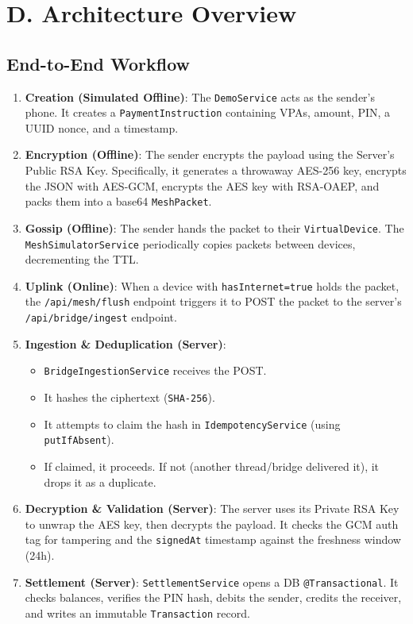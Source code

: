 \documentclass[11pt, a4paper]{article}
\begin{document}
\section*{D. Architecture Overview}

\subsection*{End-to-End Workflow}
\begin{enumerate}
    \item \textbf{Creation (Simulated Offline)}: The \texttt{DemoService} acts as the sender's phone. It creates a \texttt{PaymentInstruction} containing VPAs, amount, PIN, a UUID nonce, and a timestamp.
    \item \textbf{Encryption (Offline)}: The sender encrypts the payload using the Server's Public RSA Key. Specifically, it generates a throwaway AES-256 key, encrypts the JSON with AES-GCM, encrypts the AES key with RSA-OAEP, and packs them into a base64 \texttt{MeshPacket}.
    \item \textbf{Gossip (Offline)}: The sender hands the packet to their \texttt{VirtualDevice}. The \texttt{MeshSimulatorService} periodically copies packets between devices, decrementing the TTL.
    \item \textbf{Uplink (Online)}: When a device with \texttt{hasInternet=true} holds the packet, the \texttt{/api/mesh/flush} endpoint triggers it to POST the packet to the server's \texttt{/api/bridge/ingest} endpoint.
    \item \textbf{Ingestion \& Deduplication (Server)}:
    \begin{itemize}
        \item \texttt{BridgeIngestionService} receives the POST.
        \item It hashes the ciphertext (\texttt{SHA-256}).
        \item It attempts to claim the hash in \texttt{IdempotencyService} (using \texttt{putIfAbsent}).
        \item If claimed, it proceeds. If not (another thread/bridge delivered it), it drops it as a duplicate.
    \end{itemize}
    \item \textbf{Decryption \& Validation (Server)}: The server uses its Private RSA Key to unwrap the AES key, then decrypts the payload. It checks the GCM auth tag for tampering and the \texttt{signedAt} timestamp against the freshness window (24h).
    \item \textbf{Settlement (Server)}: \texttt{SettlementService} opens a DB \texttt{@Transactional}. It checks balances, verifies the PIN hash, debits the sender, credits the receiver, and writes an immutable \texttt{Transaction} record.
\end{enumerate}
\end{document}
